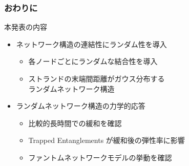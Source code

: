 \documentclass[12pt, dvipdfmx]{beamer}
\newcommand{\backupbegin}{
   \newcounter{framenumberappendix}
   \setcounter{framenumberappendix}{\value{framenumber}}
}
\begin{document}
\begin{frame}
	\frametitle{おわりに}
		\begin{block}{本発表の内容}
			\begin{itemize}
			\item ネットワーク構造の連結性にランダム性を導入
				\begin{itemize}
					\item 各ノードごとにランダムな結合性を導入
					\item ストランドの末端間距離がガウス分布する\\ランダムネットワーク構造
				\end{itemize}
			\item ランダムネットワーク構造の力学的応答
				\begin{itemize}
					\item 比較的長時間での緩和を確認
					\item Trapped Entanglements が緩和後の弾性率に影響 
					\item ファントムネットワークモデルの挙動を確認
				\end{itemize}
			\end{itemize}
		\end{block}
\end{frame}





\end{document}
